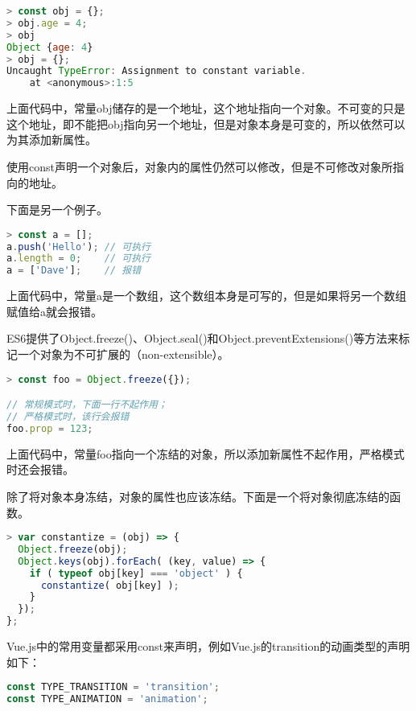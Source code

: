 \begin{lstlisting}[language=JavaScript]
> const obj = {};
> obj.age = 4;
> obj
Object {age: 4}
> obj = {};
Uncaught TypeError: Assignment to constant variable.
    at <anonymous>:1:5
\end{lstlisting}

上面代码中，常量obj储存的是一个地址，这个地址指向一个对象。不可变的只是这个地址，即不能把obj指向另一个地址，但是对象本身是可变的，所以依然可以为其添加新属性。


使用const声明一个对象后，对象内的属性仍然可以修改，但是不可修改对象所指向的地址。

下面是另一个例子。

\begin{lstlisting}[language=JavaScript]
> const a = [];
a.push('Hello'); // 可执行
a.length = 0;    // 可执行
a = ['Dave'];    // 报错
\end{lstlisting}

上面代码中，常量a是一个数组，这个数组本身是可写的，但是如果将另一个数组赋值给a就会报错。



ES6提供了Object.freeze()、Object.seal()和Object.preventExtensions()等方法来标记一个对象为不可扩展的（non-extensible）。

\begin{lstlisting}[language=JavaScript]
> const foo = Object.freeze({});

// 常规模式时，下面一行不起作用；
// 严格模式时，该行会报错
foo.prop = 123;
\end{lstlisting}

上面代码中，常量foo指向一个冻结的对象，所以添加新属性不起作用，严格模式时还会报错。

除了将对象本身冻结，对象的属性也应该冻结。下面是一个将对象彻底冻结的函数。

\begin{lstlisting}[language=JavaScript]
> var constantize = (obj) => {
  Object.freeze(obj);
  Object.keys(obj).forEach( (key, value) => {
    if ( typeof obj[key] === 'object' ) {
      constantize( obj[key] );
    }
  });
};
\end{lstlisting}

Vue.js中的常用变量都采用const来声明，例如Vue.js的transition的动画类型的声明如下：


\begin{lstlisting}[language=JavaScript]
const TYPE_TRANSITION = 'transition';
const TYPE_ANIMATION = 'animation';
\end{lstlisting}




